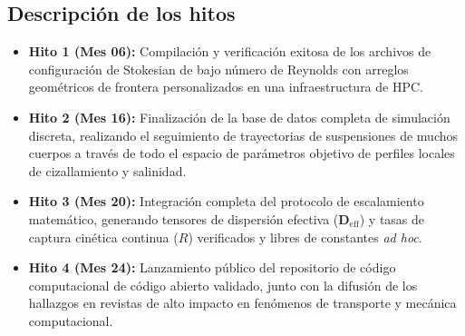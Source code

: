 \subsection{Descripción de los hitos}
\begin{itemize}
    \item \textbf{Hito 1 (Mes 06):} Compilación y verificación exitosa de los archivos de configuración de Stokesian de bajo número de Reynolds con arreglos geométricos de frontera personalizados en una infraestructura de HPC.
    \item \textbf{Hito 2 (Mes 16):} Finalización de la base de datos completa de simulación discreta, realizando el seguimiento de trayectorias de suspensiones de muchos cuerpos a través de todo el espacio de parámetros objetivo de perfiles locales de cizallamiento y salinidad.
    \item \textbf{Hito 3 (Mes 20):} Integración completa del protocolo de escalamiento matemático, generando tensores de dispersión efectiva ($\bm{D}_{\text{eff}}$) y tasas de captura cinética continua ($R$) verificados y libres de constantes \emph{ad hoc}.
    \item \textbf{Hito 4 (Mes 24):} Lanzamiento público del repositorio de código computacional de código abierto validado, junto con la difusión de los hallazgos en revistas de alto impacto en fenómenos de transporte y mecánica computacional.
\end{itemize}
